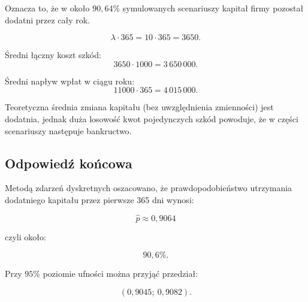 \documentclass[12pt, a4paper]{article}
\begin{document}
Oznacza to, że w około $90{,}64\%$ symulowanych scenariuszy kapitał firmy
pozostał dodatni przez cały rok.

\[
\lambda \cdot 365 = 10 \cdot 365 = 3650.
\]

Średni łączny koszt szkód:
\[
3650 \cdot 1000 = 3\,650\,000.
\]

Średni napływ wpłat w ciągu roku:
\[
11000 \cdot 365 = 4\,015\,000.
\]

Teoretyczna średnia zmiana kapitału (bez uwzględnienia zmienności) jest dodatnia,
jednak duża losowość kwot pojedynczych szkód powoduje, że w części scenariuszy
następuje bankructwo.

\subsection{Odpowiedź końcowa}
Metodą zdarzeń dyskretnych oszacowano, że prawdopodobieństwo utrzymania dodatniego
kapitału przez pierwsze 365 dni wynosi:

\[
\boxed{\hat{p}\approx 0{,}9064}
\]

czyli około:

\[
\boxed{90{,}6\%}.
\]

Przy $95\%$ poziomie ufności można przyjąć przedział:

\[
\boxed{(0{,}9045;\ 0{,}9082)}.
\]

  \newpage
  \renewcommand{\lstlistlistingname}{Spis fragmentów kodu}

  \listoffigures
  \vspace{1cm}
  \listoftables
  \vspace{1cm}
  \lstlistoflistings
\end{document}
